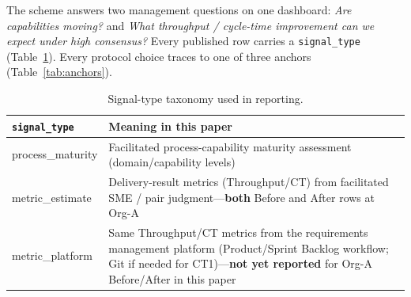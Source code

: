 \documentclass[10pt,conference]{IEEEtran}
\begin{document}
The scheme answers two management questions on one dashboard: \emph{Are capabilities moving?} and \emph{What throughput / cycle-time improvement can we expect under high consensus?}
Every published row carries a \texttt{signal\_type} (Table~\ref{tab:signal-types}).
Every protocol choice traces to one of three anchors (Table~\ref{tab:anchors}).

\begin{table}[!t]
\centering
\caption{Signal-type taxonomy used in reporting.}
\label{tab:signal-types}
\footnotesize
\setlength{\tabcolsep}{3pt}
\begin{tabular}{@{}>{\ttfamily\raggedright\arraybackslash}p{}>{\raggedright\arraybackslash}p{}@{}}
\toprule
\normalfont\texttt{signal\_type} & Meaning in this paper \\
\midrule
process\_maturity & Facilitated process-capability maturity assessment (domain/capability levels) \\
metric\_estimate & Delivery-result metrics (Throughput/CT) from facilitated SME / pair judgment---\textbf{both} Before and After rows at Org-A \\
metric\_platform & Same Throughput/CT metrics from the requirements management platform (Product/Sprint Backlog workflow; Git if needed for CT1)---\textbf{not yet reported} for Org-A Before/After in this paper \\
\bottomrule
\end{tabular}
\end{table}

\end{document}
